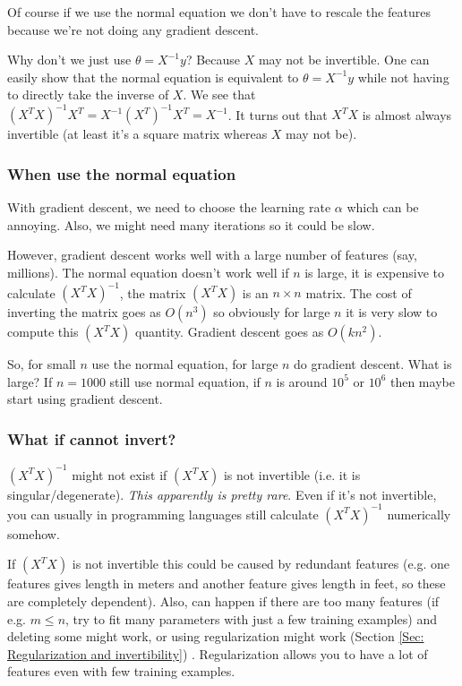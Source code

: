 \documentclass[a4paper, 10pt,hidelinks]{article}
\begin{document}
Of course if we use the normal equation we don't have to rescale the features because we're not doing any gradient descent. 

Why don't we just use $\theta = X^{-1} y$? Because $X$ may not be invertible. One can easily show that the normal equation is equivalent to $\theta = X^{-1} y$ while not having to directly take the inverse of $X$. We see that $(X^T X)^{-1}X^T = X^{-1} (X^T)^{-1} X^T = X^{-1}$. It turns out that $X^T X$ is almost always invertible (at least it's a square matrix whereas $X$ may not be).

\subsubsection{When use the normal equation}
With gradient descent, we need to choose the learning rate $\alpha$ which can be annoying. Also, we might need many iterations so it could be slow. 

However, gradient descent works well with a large number of features (say, millions). The normal equation doesn't work well if $n$ is large, it is expensive to calculate $(X^T X)^{-1}$, the matrix $(X^T X)$ is an $n \times n$ matrix. The cost of inverting the matrix goes as $O(n^3)$ so obviously for large $n$ it is very slow to compute this $(X^T X)$ quantity. Gradient descent goes as $O(k n^2)$.

So, for small $n$ use the normal equation, for large $n$ do gradient descent. What is large? If $n = 1000$ still use normal equation, if $n$ is around $10^5$ or $10^6$ then maybe start using gradient descent. 

\subsubsection{What if cannot invert?}
$(X^T X)^{-1}$ might not exist if $(X^T X)$ is not invertible (i.e. it is singular/degenerate). \emph{This apparently is pretty rare}. Even if it's not invertible, you can usually in programming languages still calculate $(X^T X)^{-1}$ numerically somehow. 

If $(X^T X)$ is not invertible this could be caused by redundant features (e.g. one features gives length in meters and another feature gives length in feet, so these are completely dependent). Also, can happen if there are too many features (if e.g. $m \leq n$, try to fit many parameters with just a few training examples) and deleting some might work, or using regularization might work (Section \ref{Sec: Regularization and invertibility}) . Regularization allows you to have a lot of features even with few training examples.
\end{document}
